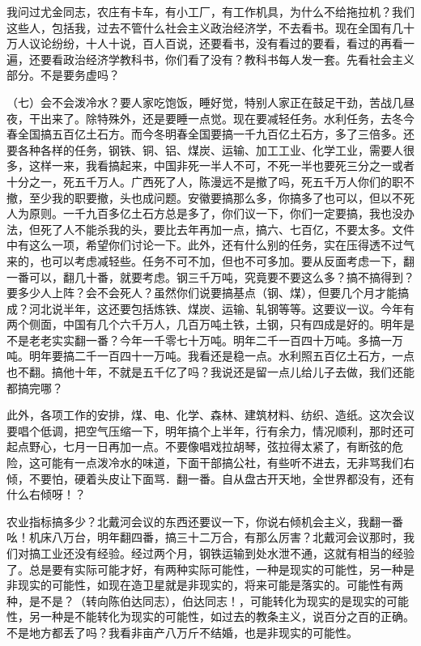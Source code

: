 我问过尤金同志，农庄有卡车，有小工厂，有工作机具，为什么不给拖拉机？我们这些人，包括我，过去不管什么社会主义政治经济学，不去看书。现在全国有几十万人议论纷纷，十人十说，百人百说，还要看书，没有看过的要看，看过的再看一遍，还要看政治经济学教科书，你们看了没有？教科书每人发一套。先看社会主义部分。不是要务虚吗？

（七）会不会泼冷水？要人家吃饱饭，睡好觉，特别人家正在鼓足干劲，苦战几昼夜，干出来了。除特殊外，还是要睡一点觉。现在要减轻任务。水利任务，去冬今春全国搞五百亿土石方。而今冬明春全国要搞一千九百亿土石方，多了三倍多。还要各种各样的任务，钢铁、铜、铝、煤炭、运输、加工工业、化学工业，需要人很多，这样一来，我看搞起来，中国非死一半人不可，不死一半也要死三分之一或者十分之一，死五千万人。广西死了人，陈漫远不是撤了吗，死五千万人你们的职不撤，至少我的职要撤，头也成问题。安徽要搞那么多，你搞多了也可以，但以不死人为原则。一千九百多亿土石方总是多了，你们议一下，你们一定要搞，我也没办法，但死了人不能杀我的头，要比去年再加一点，搞六、七百亿，不要太多。文件中有这么一项，希望你们讨论一下。此外，还有什么别的任务，实在压得透不过气来的，也可以考虑减轻些。任务不可不加，但也不可多加。要从反面考虑一下，翻一番可以，翻几十番，就要考虑。钢三千万吨，究竟要不要这么多？搞不搞得到？要多少人上阵？会不会死人？虽然你们说要搞基点（钢、煤），但要几个月才能搞成？河北说半年，这还要包括炼铁、煤炭、运输、轧钢等等。这要议一议。今年有两个侧面，中国有几个六千万人，几百万吨土铁，土钢，只有四成是好的。明年是不是老老实实翻一番？今年一千零七十万吨。明年二千一百四十万吨。多搞一万吨。明年要搞二千一百四十一万吨。我看还是稳一点。水利照五百亿土石方，一点也不翻。搞他十年，不就是五千亿了吗？我说还是留一点儿给儿子去做，我们还能都搞完哪？

此外，各项工作的安排，煤、电、化学、森林、建筑材料、纺织、造纸。这次会议要唱个低调，把空气压缩一下，明年搞个上半年，行有余力，情况顺利，那时还可起点野心，七月一日再加一点。不要像唱戏拉胡琴，弦拉得太紧了，有断弦的危险，这可能有一点泼冷水的味道，下面干部搞公社，有些听不进去，无非骂我们右倾，不要怕，硬着头皮让下面骂．翻一番。自从盘古开天地，全世界都没有，还有什么右倾呀！？

农业指标搞多少？北戴河会议的东西还要议一下，你说右倾机会主义，我翻一番吆！机床八万台，明年翻四番，搞三十二万合，有那么厉害？北戴河会议那时，我们对搞工业还没有经验。经过两个月，钢铁运输到处水泄不通，这就有相当的经验了。总是要有实际可能才好，有两种实际可能性，一种是现实的可能性，另一种是非现实的可能性，如现在造卫星就是非现实的，将来可能是落实的。可能性有两种，是不是？（转向陈伯达同志），伯达同志！，可能转化为现实的是现实的可能性，另一种是不能转化为现实的可能性，如过去的教条主义，说百分之百的正确。不是地方都丢了吗？我看非亩产八万斤不结婚，也是非现实的可能性。

